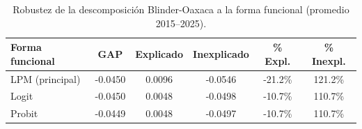 \begin{table}[htbp]
\centering
\caption{Robustez de la descomposición Blinder-Oaxaca a la forma funcional (promedio 2015--2025).}
\label{tab:oaxaca-robustez}
\begin{tabular}{lccccc}
\hline\hline
Forma funcional & GAP & Explicado & Inexplicado & \% Expl. & \% Inexpl. \\
\hline
LPM (principal) & -0.0450 & 0.0096 & -0.0546 & -21.2\% & 121.2\% \\
Logit & -0.0450 & 0.0048 & -0.0498 & -10.7\% & 110.7\% \\
Probit & -0.0449 & 0.0048 & -0.0497 & -10.7\% & 110.7\% \\
\hline\hline
\end{tabular}
\end{table}